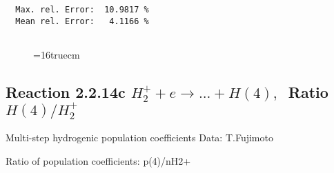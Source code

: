 \documentclass[12pt]{article}
\begin{document}
\begin{small}
\begin{verbatim}
  Max. rel. Error:  10.9817 %
  Mean rel. Error:   4.1166 %


\end{verbatim}\end{small}
\begin{figure} \label{2.2.14b}
\epsfxsize=16truecm
\end{figure}
\newpage

\subsection{
Reaction 2.2.14c $ H_2^+ + e \rightarrow ...+ H(4) , \   $
Ratio $H(4)/H_2^+  $
}

 Multi-step hydrogenic population coefficients
 Data: T.Fujimoto

 Ratio of population coefficients: p(4)/nH2+
\end{document}
